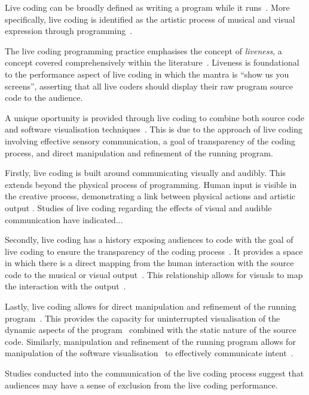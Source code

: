 Live coding can be broadly defined as writing a program while it runs~\cite{Ward2004}. More specifically, live coding is identified as the artistic process of musical and visual expression through programming~\cite{Collins2003}.

The live coding programming practice emphasises the concept of \emph{liveness}, a concept covered comprehensively within the literature~\cite{Auslander,Masura2007}. Liveness is foundational to the performance aspect of live coding in which the mantra is ``show us you screens'', asserting that all live coders should display their raw program source code to the audience.

A unique oportunity is provided through live coding to combine both source code and software visualisation techniques~\cite{McLean2010a}. This is due to the approach of live coding involving effective sensory communication, a goal of transparency of the coding process, and direct manipulation and refinement of the running program.

Firstly, live coding is built around communicating visually and audibly. This extends beyond the physical process of programming. Human input is visible in the creative process, demonstrating a link between physical actions and artistic output \cite{Mclean}. Studies of live coding regarding the effects of visual and audible communication have indicated...

Secondly, live coding has a history exposing audiences to code with the goal of live coding to ensure the transparency of the coding process~\cite{Collins2011,McLean2010a}. It provides a space in which there is a direct mapping from the human interaction with the source code to the musical or visual output~\cite{Mclean}. This relationship allows for visuals to map the interaction with the output~.

Lastly, live coding allows for direct manipulation and refinement of the running program~\cite{Swift2013}. This provides the capacity for uninterrupted visualisation of the dynamic aspects of the program~ combined with the static nature of the source code. Similarly, manipulation and refinement of the running program allows for manipulation of the software visualisation~\cite{McLean2010a} to effectively communicate intent~.

{\color{red} Studies conducted into the communication of the live coding process suggest that audiences may have a sense of exclusion from the live coding performance.}

